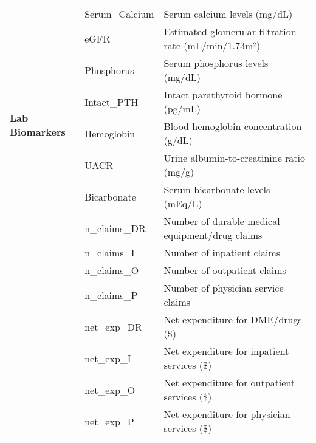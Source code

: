 \documentclass[letterpaper]{article}
\begin{document}
\begin{longtable}{@{}llp{8cm}@{}}
\multirow{8}{*}{\textbf{Lab Biomarkers}} 
& Serum\_Calcium & Serum calcium levels (mg/dL) \\
& eGFR & Estimated glomerular filtration rate (mL/min/1.73m²) \\
& Phosphorus & Serum phosphorus levels (mg/dL) \\
& Intact\_PTH & Intact parathyroid hormone (pg/mL) \\
& Hemoglobin & Blood hemoglobin concentration (g/dL) \\
& UACR & Urine albumin-to-creatinine ratio (mg/g) \\
& Bicarbonate & Serum bicarbonate levels (mEq/L) \\
\midrule

\multirow{8}{*}{\textbf{Healthcare Utilization}} 
& n\_claims\_DR & Number of durable medical equipment/drug claims \\
& n\_claims\_I & Number of inpatient claims \\
& n\_claims\_O & Number of outpatient claims \\
& n\_claims\_P & Number of physician service claims \\
& net\_exp\_DR & Net expenditure for DME/drugs (\$) \\
& net\_exp\_I & Net expenditure for inpatient services (\$) \\
& net\_exp\_O & Net expenditure for outpatient services (\$) \\
& net\_exp\_P & Net expenditure for physician services (\$) \\

\end{longtable}
\end{document}
